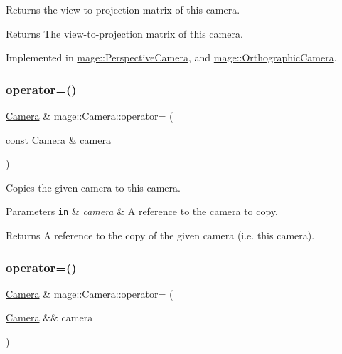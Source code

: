 Returns the view-\/to-\/projection matrix of this camera.

\begin{DoxyReturn}{Returns}
The view-\/to-\/projection matrix of this camera. 
\end{DoxyReturn}


Implemented in \hyperlink{classmage_1_1_perspective_camera_a5b733ac978a22dc58b04cf301899d575}{mage\+::\+Perspective\+Camera}, and \hyperlink{classmage_1_1_orthographic_camera_a1e8ea42a5df6dab1163b2c3938480f7c}{mage\+::\+Orthographic\+Camera}.

\hypertarget{classmage_1_1_camera_a9ae561f9cc0ed0dd855ee1d824dad090}{}\label{classmage_1_1_camera_a9ae561f9cc0ed0dd855ee1d824dad090} 
\subsubsection{\texorpdfstring{operator=()}{operator=()}\hspace{0.1cm}{\footnotesize\ttfamily [1/2]}}
{\footnotesize\ttfamily \hyperlink{classmage_1_1_camera}{Camera} \& mage\+::\+Camera\+::operator= (\begin{DoxyParamCaption}\item[{const \hyperlink{classmage_1_1_camera}{Camera} \&}]{camera }\end{DoxyParamCaption})\hspace{0.3cm}{\ttfamily [default]}}

Copies the given camera to this camera.


\begin{DoxyParams}[1]{Parameters}
\mbox{\tt in}  & {\em camera} & A reference to the camera to copy. \\
\hline
\end{DoxyParams}
\begin{DoxyReturn}{Returns}
A reference to the copy of the given camera (i.\+e. this camera). 
\end{DoxyReturn}
\hypertarget{classmage_1_1_camera_a83e33f57394e85eee58745eb8e05b282}{}\label{classmage_1_1_camera_a83e33f57394e85eee58745eb8e05b282} 
\subsubsection{\texorpdfstring{operator=()}{operator=()}\hspace{0.1cm}{\footnotesize\ttfamily [2/2]}}
{\footnotesize\ttfamily \hyperlink{classmage_1_1_camera}{Camera} \& mage\+::\+Camera\+::operator= (\begin{DoxyParamCaption}\item[{\hyperlink{classmage_1_1_camera}{Camera} \&\&}]{camera }\end{DoxyParamCaption})\hspace{0.3cm}{\ttfamily [default]}}

